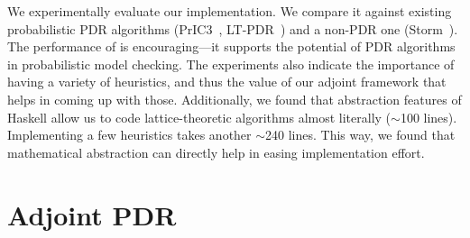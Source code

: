 We experimentally evaluate our implementation. We compare it against existing probabilistic PDR algorithms (PrIC3~\cite{BJKKMS20}, LT-PDR~\cite{KUKSH22}) and a non-PDR one (Storm~\cite{DJKV17}). The performance of \ADPDR{} is encouraging---it supports the potential of PDR algorithms in probabilistic model checking. The experiments also indicate the importance of having a variety of heuristics, and thus the value of our adjoint framework that helps in coming up with those.
Additionally, we found that abstraction features of Haskell allow us to code lattice-theoretic algorithms almost literally ($\sim$100 lines). Implementing a few heuristics takes another $\sim$240 lines. This way, we found that mathematical abstraction can directly help in easing implementation effort.

\section{Adjoint PDR}\label{sec:pdr:APDR}

